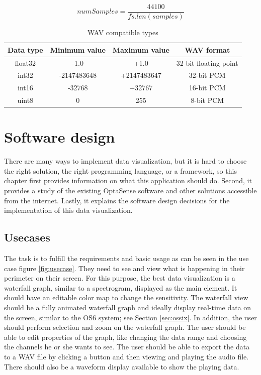 \begin{equation}
    \label{formula:sampling}
    numSamples = \frac{44100}{fs.len(samples)}
\end{equation}


\begin{table}[]
    \centering
    \begin{tabular}{|c|c|c|c|}
    \hline
    \textbf{Data type} & \textbf{Minimum value} & \textbf{Maximum value} & \textbf{WAV format} \\
    \hline
    float32 & -1.0 & +1.0 & 32-bit floating-point \\ \hline
    int32 & -2147483648 & +2147483647 & 32-bit PCM \\ \hline
    int16 & -32768 & +32767 & 16-bit PCM \\ \hline
    uint8 & 0 & 255 & 8-bit PCM \\
    \hline
    \end{tabular}
    \caption{WAV compatible types}
    \label{tab:my_label}
\end{table}




\newpage

\section{Software design}


There are many ways to implement data visualization, but it is hard to choose the right solution, the right programming language, or a framework, so this chapter first provides information on what this application should do. Second, it provides a study of the existing OptaSense software and other solutions accessible from the internet. Lastly, it explains the software design decisions for the implementation of this data visualization.

\subsection{Usecases}\label{lab:usecases}

The task is to fulfill the requirements and basic usage as can be seen in the use case figure \ref{fig:usecase}. They need to see and view what is happening in their perimeter on their screen. For this purpose, the best data visualization is a waterfall graph, similar to a spectrogram, displayed as the main element. It should have an editable color map to change the sensitivity. The waterfall view should be a fully animated waterfall graph and ideally display real-time data on the screen, similar to the OS6 system; see Section \ref{sec:ossix}. In addition, the user should perform selection and zoom on the waterfall graph. The user should be able to edit properties of the graph, like changing the data range and choosing the channels he or she wants to see. The user should be able to export the data to a WAV file by clicking a button and then viewing and playing the audio file. There should also be a waveform display available to show the playing data.

